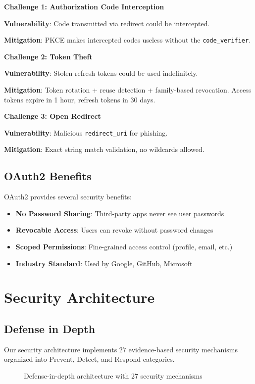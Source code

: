 \documentclass[12pt,a4paper]{article}
\begin{document}
\textbf{Challenge 1: Authorization Code Interception}

\textbf{Vulnerability}: Code transmitted via redirect could be intercepted.

\textbf{Mitigation}: PKCE makes intercepted codes useless without the \texttt{code\_verifier}.

\textbf{Challenge 2: Token Theft}

\textbf{Vulnerability}: Stolen refresh tokens could be used indefinitely.

\textbf{Mitigation}: Token rotation + reuse detection + family-based revocation. Access tokens expire in 1 hour, refresh tokens in 30 days.

\textbf{Challenge 3: Open Redirect}

\textbf{Vulnerability}: Malicious \texttt{redirect\_uri} for phishing.

\textbf{Mitigation}: Exact string match validation, no wildcards allowed.

\subsection{OAuth2 Benefits}

OAuth2 provides several security benefits:
\begin{itemize}
    \item \textbf{No Password Sharing}: Third-party apps never see user passwords
    \item \textbf{Revocable Access}: Users can revoke without password changes
    \item \textbf{Scoped Permissions}: Fine-grained access control (profile, email, etc.)
    \item \textbf{Industry Standard}: Used by Google, GitHub, Microsoft
\end{itemize}

\section{Security Architecture}

\subsection{Defense in Depth}

Our security architecture implements 27 evidence-based security mechanisms organized into Prevent, Detect, and Respond categories.

\begin{figure}[H]
    \centering
    
    \caption{Defense-in-depth architecture with 27 security mechanisms}
    \label{fig:security_layers}
\end{figure}
\end{document}

